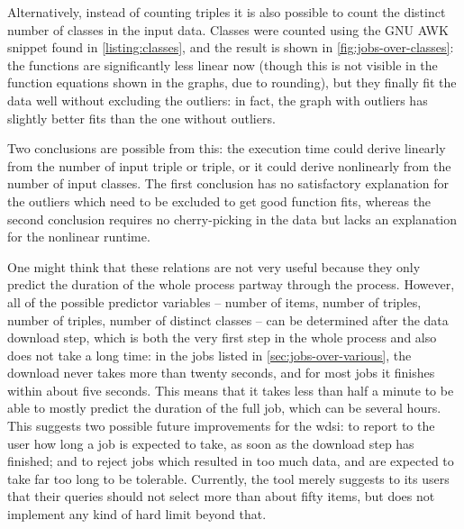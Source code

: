 Alternatively, instead of counting  \glspl{triple}
it is also possible to count the distinct number of classes in the input data.
Classes were counted using the GNU AWK snippet found in \cref{listing:classes},
and the result is shown in \cref{fig:jobs-over-classes}:
the functions are significantly less linear now
(though this is not visible in the function equations shown in the graphs, due to rounding),
but they finally fit the data well without excluding the outliers:
in fact, the graph with outliers has slightly better fits than the one without outliers.

Two conclusions are possible from this:
the execution time could derive linearly from the number of input \gls{triple} or  \gls{triple},
or it could derive nonlinearly from the number of input classes.
The first conclusion has no satisfactory explanation for the outliers
which need to be excluded to get good function fits,
whereas the second conclusion requires no cherry-picking in the data
but lacks an explanation for the nonlinear runtime.

One might think that these relations are not very useful
because they only predict the duration of the whole process partway through the process.
However, all of the possible predictor variables – %
number of \glspl{item}, number of \glspl{triple}, number of  \glspl{triple}, number of distinct classes –
can be determined after the data download step,
which is both the very first step in the whole process
and also does not take a long time:
in the jobs listed in \cref{sec:jobs-over-various},
the download never takes more than twenty seconds,
and for most jobs it finishes within about five seconds.
This means that it takes less than half a minute
to be able to mostly predict the duration of the full job, which can be several hours.
This suggests two possible future improvements
for the \gls{wdsi}:
to report to the user how long a job is expected to take,
as soon as the download step has finished;
and to reject jobs which resulted in too much data,
and are expected to take far too long to be tolerable.
Currently, the tool merely suggests to its users
that their queries should not select more than about fifty \glspl{item},
but does not implement any kind of hard limit beyond that.

